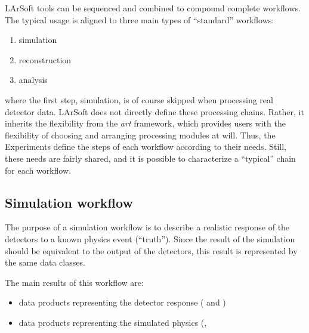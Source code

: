 
LArSoft tools can be sequenced and combined to compound complete workflows.
The typical usage is aligned to three main types of ``standard'' workflows: %
\begin{enumerate}
  \item simulation
  \item reconstruction
  \item analysis
\end{enumerate}
where the first step, simulation, is of course skipped when processing real detector data.
LArSoft does not directly define these processing chains.
Rather, it inherits the flexibility from the \emph{art} framework,
which provides users with the flexibility of choosing and arranging processing modules at will.
Thus, the Experiments define the steps of each workflow according to their needs.
Still, these needs are fairly shared,
and it is possible to characterize a ``typical'' chain for each workflow.


\subsection{Simulation workflow}
\label{ssec:Workflows:Simulation}

The purpose of a simulation workflow is to describe a realistic response of
the detectors to a known physics event (``truth'').
Since the result of the simulation should be equivalent to the output of the detectors,
this result is represented by the same data classes.

The main results of this workflow are:
\begin{itemize}
	\item data products representing the detector response (\eg {} and )
	\item data products representing the simulated physics (\eg {}, 
\end{itemize}

